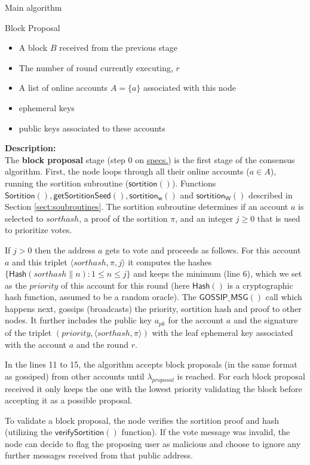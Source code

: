\documentclass[10pt,a4paper]{article}
\begin{document}
\begin{section}{Main algorithm}
\begin{subsection}{Block Proposal}
\newpage
{}
\begin{itemize}
    \item A block $B$ received from the previous stage
    \item The number of round currently executing, $r$
    \item A list of online accounts  $A=\{a\}$ associated with this node
    \item ephemeral keys
    \item public keys associated to these accounts
  \end{itemize}
\noindent \textbf{Description:}\\
The {\bf block proposal} stage (step 0 on \href{https://github.com/algorandfoundation/specs}{specs.}) is the first stage of the 
consensus algorithm. 
First, the node loops through all their online accounts ($a\in A$), 
running the sortition subroutine ($\mathsf{sortition}()$).
Functions  $\mathsf{Sortition}(), \mathsf{getSortitionSeed}(), \mathsf{sortition_w}()$ and
$\mathsf{sortition_W}()$ described in Section \ref{sect:soubroutines}.
The sortition subroutine determines if an account $a$ is selected to 
${sorthash}$, a proof of the sortition $\pi$, and an integer $j\ge 0$
that is used to prioritize votes.

If $j>0$ then the address $a$ gets to vote and proceeds as follows.
For this account $a$ and this triplet $\langle sorthash, \pi, j\rangle$
it computes the hashes $\{ \mathsf{Hash}(sorthash \| n):1\le n\le j\}$
and keeps the minimum (line 6), which we set as the $priority$ of this
account for this round (here $\mathsf{Hash}()$ is a cryptographic hash
function, assumed to be a random oracle).
The $\mathsf{GOSSIP\_MSG}()$ call which happens next, gossips (broadcasts) 
the priority, sortition hash and proof to other nodes.
It further includes the public key $a_{pk}$ for the account $a$ and the
signature of the triplet $(priority, \langle sorthash, \pi\rangle)$ with the 
leaf ephemeral key associated with the account $a$ and the round $r$.

In the lines 11 to 15, the algorithm accepts block proposals (in the same 
format as gossiped) from other accounts until $\lambda_{proposal}$ is reached.
For each block proposal received it only keeps the one with the lowest 
priority validating the block before accepting it as a possible proposal.

To validate a block proposal, the node verifies the sortition proof and hash
(utilizing the $\mathsf{verifySortition}()$ function).
If the vote message was invalid, the node can decide to flag the proposing user
as malicious and choose to ignore any further messages received from that public address.


\end{subsection}
\end{section}
\end{document}
